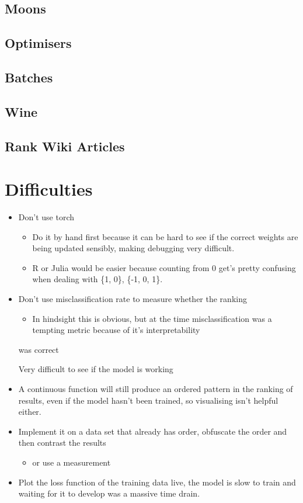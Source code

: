 \documentclass[a4paper,11pt,twoside]{article}
\begin{document}
\subsection{Moons}
\label{sec:org97c4942}
\subsection{Optimisers}
\label{sec:org36ec6ca}
\subsection{Batches}
\label{sec:org355ad27}
\subsection{Wine}
\label{sec:org26e3c1a}
\subsection{Rank Wiki Articles}
\label{sec:org04ecf27}
\section{Difficulties}
\label{sec:org2300ce3}
\begin{itemize}
\item Don't use torch
\begin{itemize}
\item Do it by hand first because it can be hard to see if the correct
weights are being updated sensibly, making debugging very difficult.
\item R or Julia would be easier because counting from 0 get's pretty
confusing when dealing with \{1, 0\}, \{-1, 0, 1\}.
\end{itemize}
\item Don't use misclassification rate to measure whether the ranking
\begin{itemize}
\item In hindsight this is obvious, but at the time misclassification
was a tempting metric because of it's interpretability
\end{itemize}
was correct

Very difficult to see if the model is working

\item A continuous function will still produce an ordered pattern in
the ranking of results, even if the model hasn't been trained,
so visualising isn't helpful either.

\item Implement it on a data set that already has order, obfuscate the
order and then contrast the results
\begin{itemize}
\item or use a measurement
\end{itemize}

\item Plot the loss function of the training data live, the model is
slow to train and waiting for it to develop was a massive time
drain.
\end{itemize}
\end{document}
